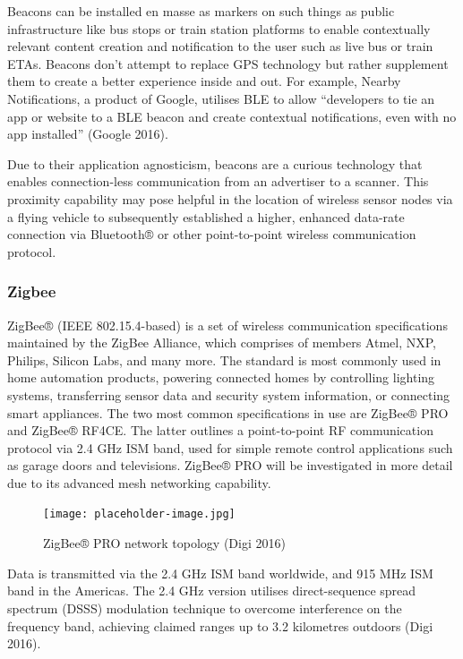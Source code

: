 Beacons can be installed en masse as markers on such things as public infrastructure like bus stops or train station platforms to enable contextually relevant content creation and notification to the user such as live bus or train ETAs. Beacons don’t attempt to replace GPS technology but rather supplement them to create a better experience inside and out. For example, Nearby Notifications, a product of Google, utilises BLE to allow “developers to tie an app or website to a BLE beacon and create contextual notifications, even with no app installed” (Google 2016).

Due to their application agnosticism, beacons are a curious technology that enables connection-less communication from an advertiser to a scanner. This proximity capability may pose helpful in the location of wireless sensor nodes via a flying vehicle to subsequently established a higher, enhanced data-rate connection via Bluetooth® or other point-to-point wireless communication protocol.

\subsubsection{Zigbee}

ZigBee® (IEEE 802.15.4-based) is a set of wireless communication specifications maintained by the ZigBee Alliance, which comprises of members Atmel, NXP, Philips, Silicon Labs, and many more. The standard is most commonly used in home automation products, powering connected homes by controlling lighting systems, transferring sensor data and security system information, or connecting smart appliances. The two most common specifications in use are ZigBee® PRO and ZigBee® RF4CE. The latter outlines a point-to-point RF communication protocol via 2.4 GHz ISM band, used for simple remote control applications such as garage doors and televisions. ZigBee® PRO will be investigated in more detail due to its advanced mesh networking capability.

\begin{figure}
    \centering
    \texttt{[image: placeholder-image.jpg]}
    \caption{ZigBee® PRO network topology (Digi 2016)}
    \label{fig:zigbee-pro-topology}
\end{figure}

Data is transmitted via the 2.4 GHz ISM band worldwide, and 915 MHz ISM band in the Americas. The 2.4 GHz version utilises direct-sequence spread spectrum (DSSS) modulation technique to overcome interference on the frequency band, achieving claimed ranges up to 3.2 kilometres outdoors (Digi 2016).


